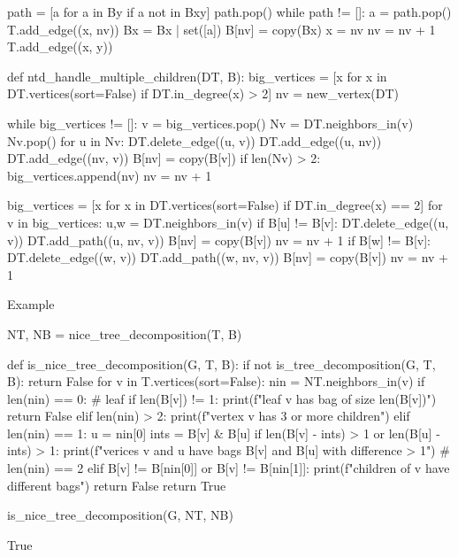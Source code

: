 \begin{sageCell}
        path = [a for a in By if a not in Bxy]
        path.pop()
        while path != []:
            a = path.pop()
            T.add_edge((x, nv))
            Bx = Bx | set([a])
            B[nv] = copy(Bx)
            x = nv
            nv = nv + 1
        T.add_edge((x, y))

def ntd_handle_multiple_children(DT, B):
    big_vertices = [x for x in DT.vertices(sort=False) if DT.in_degree(x) > 2]
    nv = new_vertex(DT)

    while big_vertices != []:
        v = big_vertices.pop()
        Nv = DT.neighbors_in(v)
        Nv.pop()
        for u in Nv:
            DT.delete_edge((u, v))
            DT.add_edge((u, nv))
        DT.add_edge((nv, v))
        B[nv] = copy(B[v])
        if len(Nv) > 2:
            big_vertices.append(nv)
        nv = nv + 1

    big_vertices = [x for x in DT.vertices(sort=False) if DT.in_degree(x) == 2]
    for v in big_vertices:
        u,w = DT.neighbors_in(v)
        if B[u] != B[v]:
            DT.delete_edge((u, v))
            DT.add_path((u, nv, v))
            B[nv] = copy(B[v])
            nv = nv + 1
        if B[w] != B[v]:
            DT.delete_edge((w, v))
            DT.add_path((w, nv, v))
            B[nv] = copy(B[v])
            nv = nv + 1
\end{sageCell}
Example
\begin{sageCell}
    NT, NB = nice_tree_decomposition(T, B)
\end{sageCell}

\begin{sageCell}
def is_nice_tree_decomposition(G, T, B):
    if not is_tree_decomposition(G, T, B):
        return False
    for v in T.vertices(sort=False):
        nin = NT.neighbors_in(v)
        if len(nin) == 0: # leaf
            if len(B[v]) != 1:
                print(f"leaf {v} has bag of size {len(B[v])}")
                return False
        elif len(nin) > 2:
            print(f"vertex {v} has 3 or more children")
        elif len(nin) == 1:
            u = nin[0]
            ints = B[v] & B[u]
            if len(B[v] - ints) > 1 or len(B[u] - ints) > 1:
                print(f"verices {v} and {u} have bags {B[v]} and {B[u]} with difference > 1")
        # len(nin) == 2
        elif B[v] != B[nin[0]] or B[v] != B[nin[1]]:
            print(f"children of {v} have different bags")
            return False
    return True
\end{sageCell}

\begin{sageCell}
    is_nice_tree_decomposition(G, NT, NB)
\end{sageCell}
\begin{outCell}
    True
\end{outCell}

